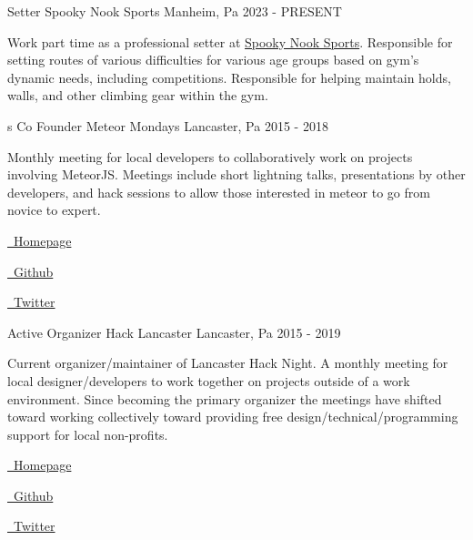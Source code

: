 \begin{cventries}
  \cventry
    {Setter}
    {Spooky Nook Sports}
    {Manheim, Pa}
    {2023 - PRESENT}
    {
      \begin{cvitems}
        \item {Work part time as a professional setter at \href{https://www.spookynooksports.com/manheim}{Spooky Nook Sports}.  Responsible for setting routes of various difficulties for various age groups based on gym's dynamic needs, including competitions.  Responsible for helping maintain holds, walls, and other climbing gear within the gym.}
      \end{cvitems}
    }
s
  \cventry
    {Co Founder}
    {Meteor Mondays}
    {Lancaster, Pa}
    {2015 - 2018}
    {
      \begin{cvitems}
        \item {Monthly meeting for local developers to collaboratively work on projects involving MeteorJS.  Meetings include short lightning talks, presentations by other developers, and hack sessions to allow those interested in meteor to go from novice to expert.}
        \item {\href{http://www.meteor-mondays.com}{\faHome\ Homepage}}
        \item {\href{http://github.com/Meteor-Mondays}{\faGithubSquare\ Github}}
        \item {\href{https://twitter.com/meteormondays}{\faTwitter\ Twitter}}
      \end{cvitems}
    }
  \cventry
    {Active Organizer}
    {Hack Lancaster}
    {Lancaster, Pa}
    {2015 - 2019}
    {
      \begin{cvitems}
        \item {Current organizer/maintainer of Lancaster Hack Night.  A monthly meeting for local designer/developers to work together on projects outside of a work environment.  Since becoming the primary organizer the meetings have shifted toward working collectively toward providing free design/technical/programming support for local non-profits.}
        \item {\href{http://www.hacklancaster.net/}{\faHome\ Homepage}}
        \item {\href{http://github.com/Hack-Lancaster}{\faGithubSquare\ Github}}
        \item {\href{https://twitter.com/hacklancaster}{\faTwitter\ Twitter}}
      \end{cvitems}
    }


\end{cventries}
